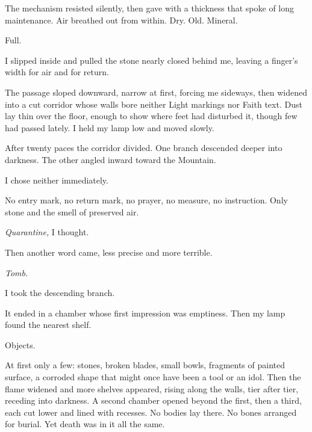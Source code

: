 The mechanism resisted silently, then gave with a thickness that spoke of long maintenance. Air breathed out from within. Dry. Old. Mineral.\par

Full.\par

I slipped inside and pulled the stone nearly closed behind me, leaving a finger's width for air and for return.\par

The passage sloped downward, narrow at first, forcing me sideways, then widened into a cut corridor whose walls bore neither Light markings nor Faith text. Dust lay thin over the floor, enough to show where feet had disturbed it, though few had passed lately. I held my lamp low and moved slowly.\par

After twenty paces the corridor divided. One branch descended deeper into darkness. The other angled inward toward the Mountain.\par

I chose neither immediately.\par

No entry mark, no return mark, no prayer, no measure, no instruction. Only stone and the smell of preserved air.\par

\textit{Quarantine,} I thought.\par

Then another word came, less precise and more terrible.\par

\textit{Tomb.}\par

I took the descending branch.\par

It ended in a chamber whose first impression was emptiness. Then my lamp found the nearest shelf.\par

Objects.\par

At first only a few: stones, broken blades, small bowls, fragments of painted surface, a corroded shape that might once have been a tool or an idol. Then the flame widened and more shelves appeared, rising along the walls, tier after tier, receding into darkness. A second chamber opened beyond the first, then a third, each cut lower and lined with recesses. No bodies lay there. No bones arranged for burial. Yet death was in it all the same.\par

